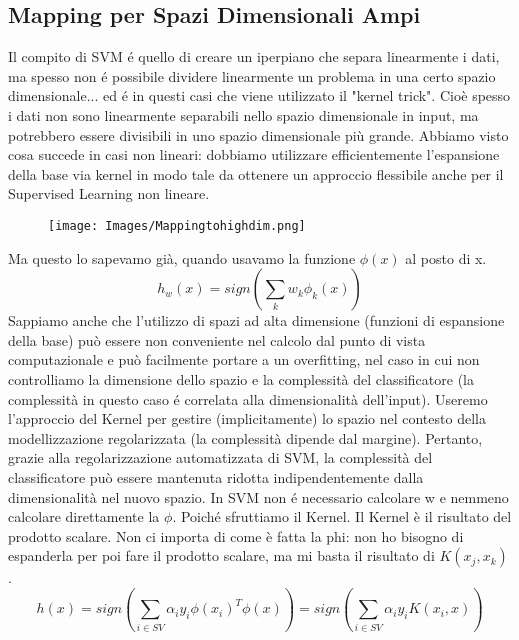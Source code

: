 \documentclass{article}
\begin{document}
\subsection{Mapping per Spazi Dimensionali Ampi}
Il compito di SVM é quello di creare un iperpiano che separa linearmente i dati, ma spesso non é possibile dividere linearmente un problema in una certo spazio dimensionale... ed é in questi casi che viene utilizzato il "kernel trick". Cioè spesso i dati non sono linearmente separabili nello spazio dimensionale in input, ma potrebbero essere divisibili in uno spazio dimensionale più grande. \newline
Abbiamo visto cosa succede in casi non lineari: dobbiamo utilizzare efficientemente l'espansione della base via kernel in modo tale da ottenere un approccio flessibile anche per il Supervised Learning non lineare.
\begin{figure}[H]
\centering
\texttt{[image: Images/Mappingtohighdim.png]}
\end{figure}
Ma questo lo sapevamo già, quando usavamo la funzione $\phi(x)$ al posto di x. 
\[ h_w(x)=sign(\sum_kw_k\phi_k(x))\]
Sappiamo anche che l'utilizzo di spazi ad alta dimensione (funzioni di espansione della base) può essere non conveniente nel calcolo dal punto di vista computazionale e può facilmente portare a un overfitting, nel caso in cui non controlliamo la dimensione dello spazio e la complessità del classificatore (la complessità in questo caso é correlata alla dimensionalità dell'input). \newline 
Useremo l'approccio del Kernel per gestire (implicitamente) lo spazio nel contesto della modellizzazione regolarizzata (la complessità dipende dal margine). Pertanto, grazie alla regolarizzazione automatizzata di SVM, la complessità del classificatore può essere mantenuta ridotta indipendentemente dalla dimensionalità nel nuovo spazio. \newline
In SVM non é necessario calcolare w e nemmeno calcolare direttamente la $\phi$. Poiché sfruttiamo il Kernel. Il Kernel è il risultato del prodotto scalare. Non ci importa di come è fatta la phi: non ho bisogno di espanderla per poi fare il prodotto scalare, ma mi basta il risultato di $K(x_j,x_k)$.
\[ h(x)=sign(\sum_{i\in SV} \alpha_iy_i\phi(x_i)^T\phi(x)) = sign(\sum_{i\in SV} \alpha_iy_iK(x_i,x))\]
\end{document}
